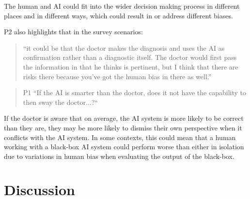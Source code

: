 \documentclass[manuscript,screen,review]{acmart}
\begin{document}
The human and AI could fit into the wider decision making process in different places and in different ways, which could result in or address different biases.

P2 also highlights that in the survey scenarios: 

\begin{quote}
“it could be that the doctor makes the diagnosis and uses the AI as confirmation rather than a diagnostic itself. The doctor would first pass the information in that he thinks is pertinent, but I think that there are risks there because you’ve got the human bias in there as well.”
\end{quote}

\begin{quote}
P1 “If the AI is smarter than the doctor, does it not have the capability to then sway the doctor...?“
\end{quote}


If the doctor is aware that on average, the AI system is more likely to be correct than they are, they may be more likely to dismiss their own perspective when it conflicts with the AI system. In some contexts, this could mean that a human working with a black-box AI system could perform worse than either in isolation due to variations in human bias when evaluating the output of the black-box. 





\newpage
\section{Discussion}


\end{document}

